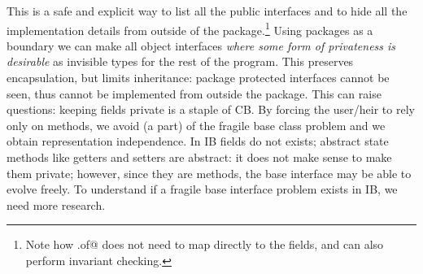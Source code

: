 \noindent This is a safe and explicit way to list all the public interfaces and to hide all the implementation
details from outside of the package.\footnote{
Note how \Q@ExposedData.of@ does not need to map directly to the fields, and can also perform
invariant checking.}
Using packages as a boundary we can make all object interfaces \emph{where some form of privateness is desirable}
as invisible types for the rest of the program.
This preserves encapsulation, but limits inheritance:
package protected interfaces cannot be seen,
thus cannot be implemented from outside the package.
This can raise questions: keeping fields private is a staple of CB.
By forcing the user/heir to rely only on methods, we avoid (a part)
of the fragile base class problem and we obtain representation independence.
In IB fields do not exists; abstract state methods like getters and
setters are abstract: it does not make sense to make them private;
however, since they are methods, the base interface may be able to
evolve freely.  To understand if a fragile base interface problem
exists in IB, we need more research.

%
%
%
%
%
%



